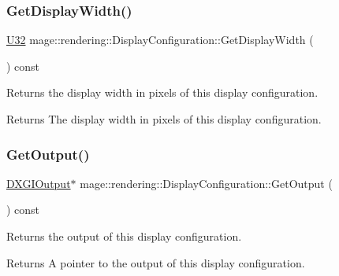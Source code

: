 \subsubsection{\texorpdfstring{Get\+Display\+Width()}{GetDisplayWidth()}}
{\footnotesize\ttfamily \mbox{\hyperlink{namespacemage_a41c104c036fba3756a74e19f793eeaa1}{U32}} mage\+::rendering\+::\+Display\+Configuration\+::\+Get\+Display\+Width (\begin{DoxyParamCaption}{ }\end{DoxyParamCaption}) const\hspace{0.3cm}{\ttfamily [noexcept]}}

Returns the display width in pixels of this display configuration.

\begin{DoxyReturn}{Returns}
The display width in pixels of this display configuration. 
\end{DoxyReturn}
\mbox{\label{classmage_1_1rendering_1_1_display_configuration_a727b2e5ebcc286bb2ae39fd1f1e69445}} 
\subsubsection{\texorpdfstring{Get\+Output()}{GetOutput()}}
{\footnotesize\ttfamily \mbox{\hyperlink{namespacemage_1_1rendering_aaf22d3893277a4bd8497f6ea69b01532}{D\+X\+G\+I\+Output}}$\ast$ mage\+::rendering\+::\+Display\+Configuration\+::\+Get\+Output (\begin{DoxyParamCaption}{ }\end{DoxyParamCaption}) const\hspace{0.3cm}{\ttfamily [noexcept]}}

Returns the output of this display configuration.

\begin{DoxyReturn}{Returns}
A pointer to the output of this display configuration. 
\end{DoxyReturn}
\mbox{\label{classmage_1_1rendering_1_1_display_configuration_a7bbb45919b9cd4ae20cc9f4cac8a7069}} 
